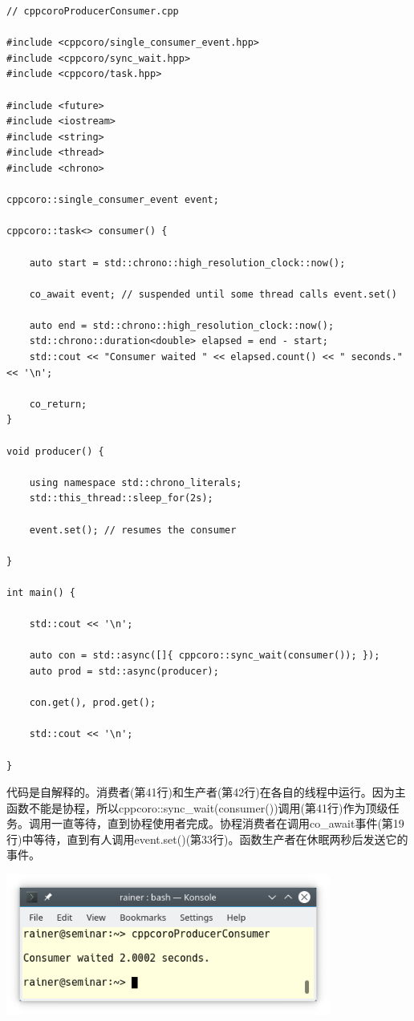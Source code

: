 \begin{lstlisting}[style=styleCXX]
// cppcoroProducerConsumer.cpp

#include <cppcoro/single_consumer_event.hpp>
#include <cppcoro/sync_wait.hpp>
#include <cppcoro/task.hpp>

#include <future>
#include <iostream>
#include <string>
#include <thread>
#include <chrono>

cppcoro::single_consumer_event event;

cppcoro::task<> consumer() {

	auto start = std::chrono::high_resolution_clock::now();
	
	co_await event; // suspended until some thread calls event.set()
	
	auto end = std::chrono::high_resolution_clock::now();
	std::chrono::duration<double> elapsed = end - start;
	std::cout << "Consumer waited " << elapsed.count() << " seconds." << '\n';
	
	co_return;
}

void producer() {

	using namespace std::chrono_literals;
	std::this_thread::sleep_for(2s);
	
	event.set(); // resumes the consumer

}

int main() {

	std::cout << '\n';
	
	auto con = std::async([]{ cppcoro::sync_wait(consumer()); });
	auto prod = std::async(producer);
	
	con.get(), prod.get();
	
	std::cout << '\n';

}
\end{lstlisting}

代码是自解释的。消费者(第41行)和生产者(第42行)在各自的线程中运行。因为主函数不能是协程，所以cppcoro::sync\_wait(consumer())调用(第41行)作为顶级任务。调用一直等待，直到协程使用者完成。协程消费者在调用co\_await事件(第19行)中等待，直到有人调用event.set()(第33行)。函数生产者在休眠两秒后发送它的事件。

\begin{center}
\includegraphics[width=0.8\textwidth]{content/5/chapter8/images/3.png}\\
\end{center}

